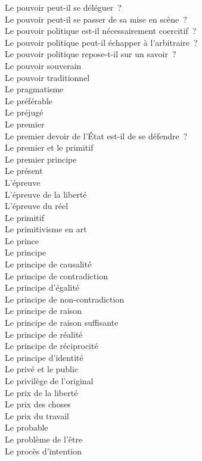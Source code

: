 \documentclass[a4paper,12pt]{article}
\begin{document}
Le pouvoir peut-il se déléguer ? \\
Le pouvoir peut-il se passer de sa mise en scène ? \\
Le pouvoir politique est-il nécessairement coercitif ? \\
Le pouvoir politique peut-il échapper à l'arbitraire ? \\
Le pouvoir politique repose-t-il sur un savoir ? \\
Le pouvoir souverain \\
Le pouvoir traditionnel \\
Le pragmatisme \\
Le préférable \\
Le préjugé \\
Le premier \\
Le premier devoir de l'État est-il de se défendre ? \\
Le premier et le primitif \\
Le premier principe \\
Le présent \\
L'épreuve \\
L'épreuve de la liberté \\
L'épreuve du réel \\
Le primitif \\
Le primitivisme en art \\
Le prince \\
Le principe \\
Le principe de causalité \\
Le principe de contradiction \\
Le principe d'égalité \\
Le principe de non-contradiction \\
Le principe de raison \\
Le principe de raison suffisante \\
Le principe de réalité \\
Le principe de réciprocité \\
Le principe d'identité \\
Le privé et le public \\
Le privilège de l'original \\
Le prix de la liberté \\
Le prix des choses \\
Le prix du travail \\
Le probable \\
Le problème de l'être \\
Le procès d'intention \\
\end{document}
